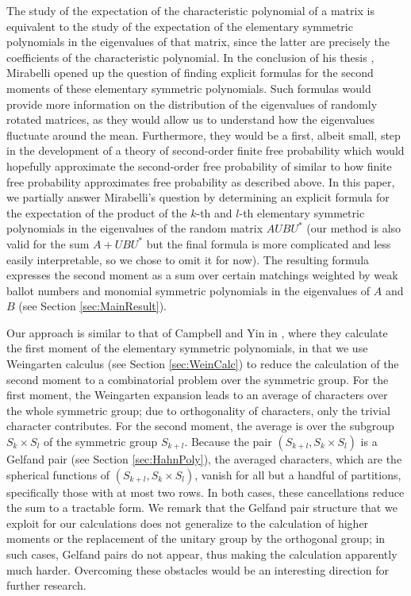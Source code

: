 \documentclass[11pt, a4paper, oneside, reqno]{amsart}
\theoremstyle{remark}
\theoremstyle{definition}
\numberwithin{equation}{section}
\begin{document}
The study of the expectation of the characteristic polynomial of a matrix is equivalent to the study of the expectation of the elementary symmetric polynomials in the eigenvalues of that matrix, since the latter are precisely the coefficients of the characteristic polynomial. In the conclusion of his thesis \cite{mirabelli2021hermitian}, Mirabelli opened up the question of finding explicit formulas for the second moments of these elementary symmetric polynomials. Such formulas would provide more information on the distribution of the eigenvalues of randomly rotated matrices, as they would allow us to understand how the eigenvalues fluctuate around the mean. Furthermore, they would be a first, albeit small, step in the development of a theory of second-order finite free probability which would hopefully approximate the second-order free probability of \cite{mingo2006second, mingo2007second, collins2007second} similar to how finite free probability approximates free probability as described above. In this paper, we partially answer Mirabelli's question by determining an explicit formula for the expectation of the product of the $k$-th and $l$-th elementary symmetric polynomials in the eigenvalues of the random matrix $AUBU^*$ (our method is also valid for the sum $A+UBU^*$ but the final formula is more complicated and less easily interpretable, so we chose to omit it for now). The resulting formula expresses the second moment as a sum over certain matchings weighted by weak ballot numbers and monomial symmetric polynomials in the eigenvalues of $A$ and $B$ (see Section \ref{sec:MainResult}).
\par 
Our approach is similar to that of Campbell and Yin in \cite{campbell2021finite}, where they calculate the first moment of the elementary symmetric polynomials, in that we use Weingarten calculus (see Section \ref{sec:WeinCalc}) to reduce the calculation of the second moment to a combinatorial problem over the symmetric group. For the first moment, the Weingarten expansion leads to an average of characters over the whole symmetric group; due to orthogonality of characters, only the trivial character contributes. For the second moment, the average is over the subgroup $S_k \times S_l$ of the symmetric group $S_{k+l}$. Because the pair $(S_{k+l},S_{k}\times S_l)$ is a Gelfand pair (see Section \ref{sec:HahnPoly}), the averaged characters, which are the spherical functions of $(S_{k+l},S_k\times S_l)$, vanish for all but a handful of partitions, specifically those with at most two rows. In both cases, these cancellations reduce the sum to a tractable form.
We remark that the Gelfand pair structure that we exploit for our calculations does not generalize to the calculation of higher moments or the replacement of the unitary group by the orthogonal group; in such cases, Gelfand pairs do not appear, thus making the calculation apparently much harder. Overcoming these obstacles would be an interesting direction for further research.
\end{document}
